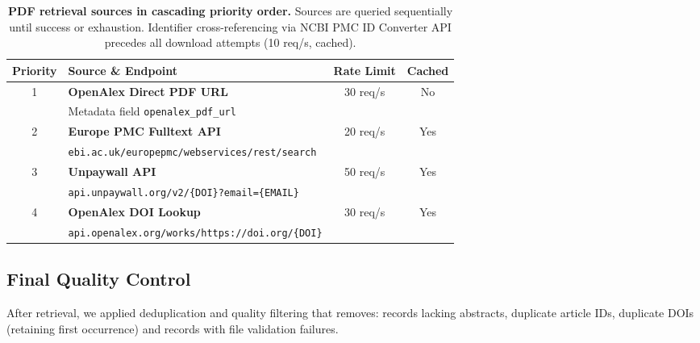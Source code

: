 \begin{table}[t]
\centering
\caption{\textbf{PDF retrieval sources in cascading priority order.} Sources are queried sequentially until success or exhaustion. Identifier cross-referencing via NCBI PMC ID Converter API precedes all download attempts (10 req/s, cached).}
\label{tab:download_sources}
\begin{small}
\begin{tabular}{clcc}
\toprule
\textbf{Priority} & \textbf{Source \& Endpoint} & \textbf{Rate Limit} & \textbf{Cached} \\
\midrule
1 & \textbf{OpenAlex Direct PDF URL} & 30 req/s & No \\
  & \quad Metadata field \texttt{openalex\_pdf\_url} & & \\
\midrule
2 & \textbf{Europe PMC Fulltext API} & 20 req/s & Yes \\
  & \quad \texttt{ebi.ac.uk/europepmc/webservices/rest/search} & & \\
\midrule
3 & \textbf{Unpaywall API} & 50 req/s & Yes \\
  & \quad \texttt{api.unpaywall.org/v2/\{DOI\}?email=\{EMAIL\}} & & \\
\midrule
4 & \textbf{OpenAlex DOI Lookup} & 30 req/s & Yes \\
  & \quad \texttt{api.openalex.org/works/https://doi.org/\{DOI\}} & & \\
\bottomrule
\end{tabular}
\end{small}
\end{table}

\subsection{Final Quality Control}

After retrieval, we applied deduplication and quality filtering that removes: records lacking abstracts, duplicate article IDs, duplicate DOIs (retaining first occurrence) and records with file validation failures.
